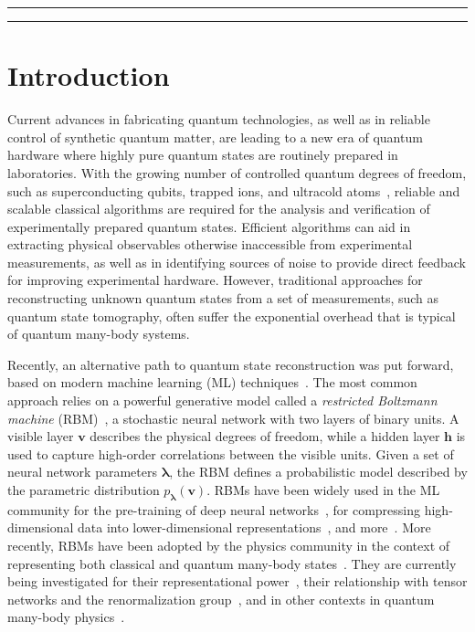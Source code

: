 \documentclass[submission, Phys, hidelnks]{SciPost}
\begin{document}
\noindent\rule{\textwidth}{1pt}
\tableofcontents\thispagestyle{fancy}
\noindent\rule{\textwidth}{1pt}
\vspace{-1cm}

\section{Introduction}
Current advances in fabricating quantum technologies, as well as in reliable
control of synthetic quantum matter, are leading to a new era of quantum
hardware where highly pure quantum states are routinely prepared in laboratories.
With the growing number of controlled quantum degrees of freedom, such as
superconducting qubits, trapped ions, and ultracold
atoms~\cite{kandala_hardware-efficient_2017,moll_quantum_2018,bernien_probing_2017,zhang_observation_2017}, reliable and scalable
classical algorithms are required for the analysis and verification of
experimentally prepared quantum states. Efficient algorithms can aid in
extracting physical observables otherwise inaccessible from experimental
measurements, as well as in identifying sources of noise to provide direct
feedback for improving experimental hardware. However, traditional approaches
for reconstructing unknown quantum states from a set of measurements, such as
quantum state tomography, often suffer the exponential overhead that is typical
of quantum many-body systems.

Recently, an alternative path to quantum state reconstruction was put forward,
based on modern machine learning (ML)
techniques~\cite{torlai_learning_2016,torlai_neural-network_2018,torlai_latent_2018,carrasquilla_reconstructing_2018,lennon_efficiently_2018,kim_mixed_2018}.
The most common approach relies on a powerful generative model called a
\textit{restricted Boltzmann machine} (RBM)~\cite{smolensky_information_1986},
a stochastic neural network with two layers of binary units.
A visible layer $\bm{v}$ describes the physical degrees of freedom, while a
hidden layer $\bm{h}$ is used to capture high-order correlations between the
visible units. Given a set of neural network parameters
 $\bm{\lambda}$, the RBM defines a probabilistic model described by the
 parametric distribution $p_{\bm{\lambda}}(\bm{v})$.
RBMs have been widely used in the ML community for the pre-training of deep
neural networks~\cite{hinton_training_2002}, for compressing high-dimensional
data into lower-dimensional representations~\cite{hinton_reducing_2006}, and
more~\cite{lecun_deep_2015}.
More recently, RBMs have been adopted by the physics community in the context
of representing both classical and quantum many-body
states~\cite{CarleoTroyer2017Science,carleo_constructing_2018}.
They are currently being investigated for their representational
power~\cite{gao_efficient_2017,choo_symmetries_2018,glasser_neural-network_2018},
their relationship with tensor networks and the renormalization
group~\cite{mehta_exact_2014,koch-janusz_mutual_2018,iso_scale-invariant_2018,lenggenhager_optimal_2018,chen_equivalence_2018},
and in other contexts in quantum many-body physics~\cite{PhysRevB.96.205152,weinstein_neural_2018,RBM_stabilizer}.
\end{document}
